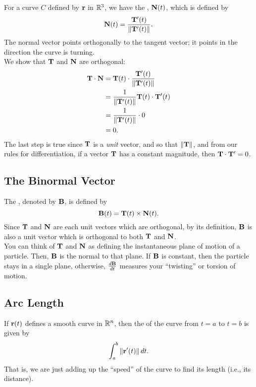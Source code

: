 For a curve \(C\) defined by \(\mathbf{r}\) in \(\mathbb{R}^{3}\), we have the , \(\mathbf{N}(t)\), which is defined by 
\[
    \mathbf{N}(t) = \frac{\mathbf{T}'(t)}{\|\mathbf{T}'(t)\|}.
\]
The normal vector points orthogonally to the tangent vector; it points in the direction the curve is turning. \\

We show that \(\mathbf{T}\) and \(\mathbf{N}\) are orthogonal:
\begin{align*}
    \mathbf{T} \cdot \mathbf{N} &= \mathbf{T}(t) \cdot \frac{\mathbf{T}'(t)}{\|\mathbf{T}'(t)\|} \\
    &= \frac{1}{\|\mathbf{T}'(t)\|} \mathbf{T}(t) \cdot \mathbf{T}'(t) \\
    &= \frac{1}{\|\mathbf{T}'(t)\|} \cdot 0 \\
    &= 0.
\end{align*}
The last step is true since \(\mathbf{T}\) is a \textit{unit} vector, and so that \(\|\mathbf{T}\|\), and from our rules for differentiation, if a vector \(\mathbf{T}\) has a constant magnitude, then \(\mathbf{T} \cdot \mathbf{T}' = 0\).

\subsection{The Binormal Vector}

The , denoted by \(\mathbf{B}\), is defined by
\[
    \mathbf{B}(t) = \mathbf{T}(t) \times \mathbf{N}(t).
\]
Since \(\mathbf{T}\) and \(\mathbf{N}\) are each unit vectors which are orthogonal, by its definition, \(\mathbf{B}\) is also a unit vector which is orthogonal to both \(\mathbf{T}\) and \(\mathbf{N}\). \\

You can think of \(\mathbf{T}\) and \(\mathbf{N}\) as defining the instantaneous plane of motion of a particle. Then, \(\mathbf{B}\) is the normal to that plane. If \(\mathbf{B}\) is constant, then the particle stays in a single plane, otherwise, \(\frac{d\mathbf{B}}{dt}\) measures your ``twisting'' or torsion of motion.

\subsection{Arc Length}

If \(\mathbf{r}(t)\) defines a smooth curve in \(\mathbb{R}^{n}\), then the  of the curve from \(t = a\) to \(t = b\) is given by
\[
    \int_{a}^{b}\|\mathbf{r}'(t)\|\, dt.
\]
That is, we are just adding up the ``speed'' of the curve to find its length (i.e., its distance).


